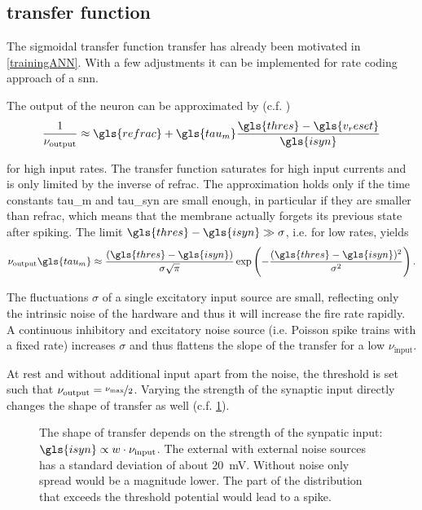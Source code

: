 \subsection{transfer function}

The sigmoidal transfer function \gls{transfer} has already been motivated in \cref{trainingANN}. With a few adjustments it can be implemented for rate coding approach of a \gls{snn}.

The output of the neuron can be approximated by (c.f. \cite{brunel2000dynamics})
\begin{equation}\label{fireratehigh}
\frac{1}{\nu_\text{output}} \approx \gls{refrac} + \gls{tau_m} \frac{\gls{thres} - \gls{v_reset}}{\gls{isyn}}
\end{equation}

for high input rates. The transfer function saturates for high input currents and is only limited by the inverse of \gls{refrac}. The approximation holds only if the time constants \gls{tau_m} and \gls{tau_syn} are small enough, in particular if they are smaller than \gls{refrac}, which means that the membrane actually forgets its previous state after spiking. The limit $\gls{thres} - \gls{isyn} \gg \sigma$, i.e. for low rates, yields
\begin{equation}\label{fireratelow}
\nu_\text{output} \gls{tau_m} \approx \frac{(\gls{thres} - \gls{isyn})}{\sigma \sqrt{\pi}} \exp\left(-\frac{(\gls{thres} - \gls{isyn})^2}{\sigma^2}\right).
\end{equation}

The fluctuations $\sigma$ of a single excitatory input source are small, reflecting only the intrinsic noise of the hardware and thus it will increase the fire rate rapidly. A continuous inhibitory and excitatory noise source (i.e. Poisson spike trains with a fixed rate) increases $\sigma$ and thus flattens the slope of the \gls{transfer} for a low $\nu_\text{input}$. 

At rest and without additional input apart from the noise, the threshold is set such that $\nu_\text{output} = \nicefrac{\nu_\text{max}}{2}$. Varying the strength of the synaptic input directly changes the shape of \gls{transfer} as well (c.f. \cref{transferfunction}).

\begin{figure}
	\label{transferfunction}
	\begin{center}
		
	\end{center}
	\caption{The shape of \gls{transfer} depends on the strength of the synpatic input: $\gls{isyn} \propto w \cdot \nu_\text{input}$. The external  with external noise sources has a standard deviation of about \SI{20}{\milli\V}. Without noise only spread would be a magnitude lower. The part of the distribution that exceeds the threshold potential would lead to a spike.}
\end{figure}


